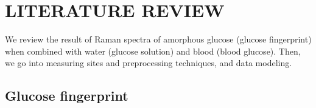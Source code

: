 \setlength{\footskip}{8mm}

\chapter{LITERATURE REVIEW}\label{literatureReview}

We review the result of Raman spectra of amorphous glucose (glucose fingerprint) when combined with water (glucose solution) and blood (blood glucose). 
Then, we go into measuring sites and preprocessing techniques, and data modeling.







\section{Glucose fingerprint}


